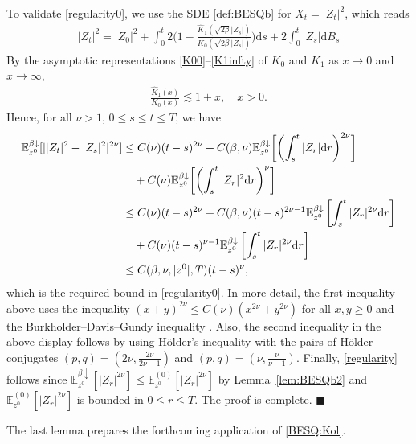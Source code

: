\documentclass[12pt, twoside]{article}
\numberwithin{figure}{section}
\newcommand{\less}{\lesssim}
\newcommand{\1}{\mathds 1}
\newcommand{\da}{{\downarrow}}
\newcommand{\E}{{\mathbb E}}
\renewcommand{\d}{{\mathrm d}}
\newcommand{\2}{{\mathbf 1}}
\renewenvironment{proof}[1][\proofname]{\noindent {\bfseries #1.}\;}{\hfill\ensuremath{\blacksquare}\\}
\newcommand{\hK}{{\widehat{K}}}
\begin{document}
\begin{proof}
To validate \eqref{regularity0}, we use the SDE \eqref{def:BESQb} for $X_t=|Z_t|^2$, which reads
\begin{align}\label{eq:BESQb}
|Z_t|^2=|Z_0|^2+\int_0^t 2\biggl(1-\frac{\hK_1(\sqrt{2\beta}|Z_s|)}{K_0(\sqrt{2\beta}|Z_s|)}\biggr)\d s+2\int_0^t|Z_s|\d B_s
\end{align}
By the asymptotic representations \eqref{K00}--\eqref{K1infty} of $K_0$ and $K_1$
as $x\to 0$ and $x\to\infty$,
\begin{align}\label{bdd:K1K0}
\frac{\hK_1(x)}{K_0(x)}\less 1+x,\quad x>0.
\end{align}
Hence, for all $\nu>1$, $0\leq s\leq t\leq T$, we have 
\begin{align}
\E_{z^0}^{\beta\da}[||Z_t|^2-|Z_s|^2|^{2\nu}]&\leq C(\nu)(t-s)^{2\nu}+
C(\beta,\nu)\E_{z^0}^{\beta\da}\biggl[\biggl(\int_s^t |Z_r|\d r\biggr)^{2\nu}\biggr]\notag\\
&\quad+
C(\nu)\E^{\beta\da}_{z^0}\biggl[\biggl(\int_s^t 
|Z_r|^2\d r\biggr)^\nu\biggr]\notag\\
&\leq C(\nu)(t-s)^{2\nu}+
C(\beta,\nu)(t-s)^{2\nu-1}\E_{z^0}^{\beta\da}\left[\int_s^t |Z_r|^{2\nu}\d r\right]\notag\\
&\quad+ C(\nu)(t-s)^{\nu-1}\E^{\beta\da}_{z^0}\left[\int_s^t |Z_r|^{2\nu}\d r\right]\notag\\
&\leq C(\beta,\nu,|z^0|,T)(t-s)^\nu,\label{regularity}
\end{align}
which is the required bound in \eqref{regularity0}.
In more detail, the first inequality above uses the inequality $(x+y)^{2\nu}\leq C(\nu)(x^{2\nu}+y^{2\nu})$ for all $x,y\geq 0$ and
the Burkholder--Davis--Gundy inequality \cite[(4.1) Theorem, p.160]{RY}. Also, the second inequality in the above display follows by using H\"older's inequality with the pairs of H\"older conjugates $(p,q)=(2\nu,\frac{2\nu}{2\nu-1})$ and $(p,q)=(\nu,\frac{\nu}{\nu-1})$. Finally, \eqref{regularity} follows since $\E^{\beta\da}_{z^0}[|Z_r|^{2\nu}]\leq \E^{(0)}_{z^0}[|Z_r|^{2\nu}]$ by Lemma~\ref{lem:BESQb2} and 
$\E^{(0)}_{z^0}[|Z_r|^{2\nu}]$ is bounded in $0\leq r\leq T$. The proof is complete.
\end{proof}

The last lemma prepares the forthcoming application of \eqref{BESQ:Kol}. 
\end{document}
